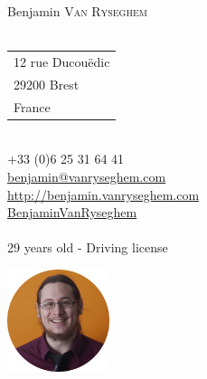 \documentclass{curve}
\title{}
\begin{document}

\begin{minipage}{7cm}
\large
Benjamin \textsc{Van Ryseghem}\\
\normalsize
\\
{ \begin{tabular}{@{}l}
12 rue Ducouëdic\\
29200 Brest\\
France
\end{tabular}}\\

{ +33 (0)6 25 31 64 41}\\
\href{mailto:benjamin@vanryseghem.com}{ benjamin@vanryseghem.com}\\
\href{http://benjamin.vanryseghem.com}{ \url{http://benjamin.vanryseghem.com}}\\
\href{https://github.com/BenjaminVanRyseghem}{ BenjaminVanRyseghem}\\
\\29 years old - Driving license
\end{minipage}
\hfill
\begin{minipage}{7cm}
  \begin{flushright}
  \includegraphics[height=3cm]{Moi}
  \end{flushright}
\end{minipage}
\maketitle
\vspace{-1cm}
\end{document}
